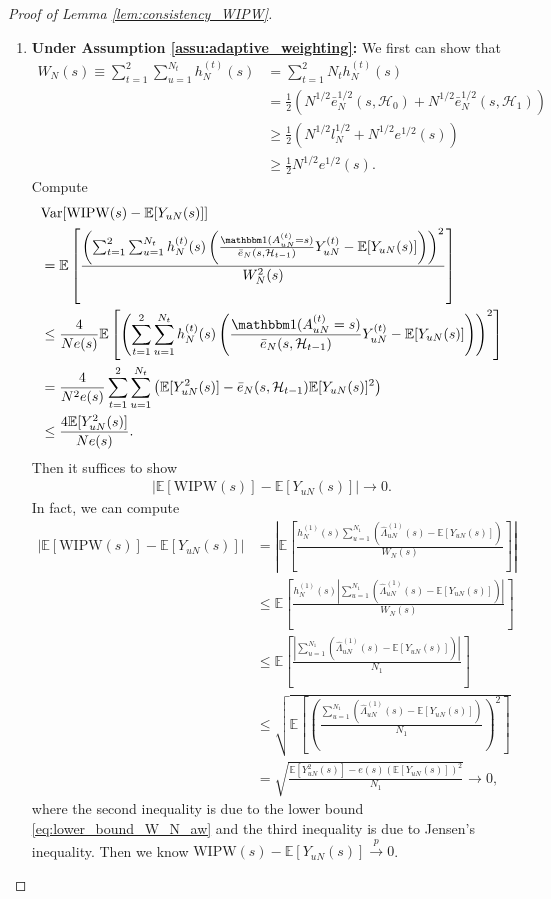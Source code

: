 \documentclass[12pt]{article}
\newcommand{\E}{\mathbb E}								%
\newcommand{\indicator}{\mathbbm 1}						%
\newcommand{\convp}{\overset p \rightarrow}             %
\newcommand{\WIPW}{\mathrm{WIPW}}
\begin{document}
\begin{proof}[Proof of Lemma \ref{lem:consistency_WIPW}]
\begin{enumerate}
		\item \textbf{Under Assumption \ref{assu:adaptive_weighting}:} We first can show that 
		\begin{align}
		W_N(s)\equiv \sum_{t=1}^2\sum_{u=1}^{N_t}h_{N}^{(t)}(s)
		&\nonumber
		= \sum_{t=1}^{2} N_t h_N^{(t)}(s)\\
		&\nonumber
		=\frac{1}{2}(N^{1/2}\bar e_N^{1/2}(s,\mathcal{H}_0)+N^{1/2}\bar e_N^{1/2}(s,\mathcal{H}_1))\\
		&\nonumber
		\geq \frac{1}{2}\left(N^{1/2}l_N^{1/2}+N^{1/2}e^{1/2}(s)\right)\\
		&\label{eq:lower_bound_W_N_aw}
		\geq \frac{1}{2}N^{1/2}e^{1/2}(s).
	\end{align}
	Compute 
	\begin{align*}
		&
		\mathrm{Var}[\WIPW(s)-\E[Y_{uN}(s)]]\\
		&
		=\E\left[\frac{\left(\sum_{t=1}^2\sum_{u=1}^{N_t}h_N^{(t)}(s)\left(\frac{\indicator(A_{uN}^{(t)}=s)}{\bar e_N(s,\mathcal{H}_{t-1})}Y_{uN}^{(t)}-\E[Y_{uN}(s)]\right)\right)^2}{W_N^2(s)}\right]\\
		&
		\leq \frac{4}{Ne(s)}\E\left[\left(\sum_{t=1}^2\sum_{u=1}^{N_t}h_N^{(t)}(s)\left(\frac{\indicator(A_{uN}^{(t)}=s)}{\bar e_N(s,\mathcal{H}_{t-1})}Y_{uN}^{(t)}-\E[Y_{uN}(s)]\right)\right)^2\right]\\
		&
		=\frac{4}{N^2e(s)}\sum_{t=1}^2\sum_{u=1}^{N_t}\left(\E[Y_{uN}^2(s)]-\bar e_N(s,\mathcal{H}_{t-1})\E[Y_{uN}(s)]^2\right)\\
		&
		\leq \frac{4\E[Y_{uN}^2(s)]}{Ne(s)}.
	\end{align*}
	Then it suffices to show 
	\begin{align*}
		|\E[\WIPW(s)]-\E[Y_{uN}(s)]|\rightarrow0.
	\end{align*}
	In fact, we can compute 
	\begin{align*}
		|\E[\WIPW(s)]-\E[Y_{uN}(s)]|
		&
		=\left|\E\left[\frac{h_N^{(1)}(s)\sum_{u=1}^{N_1}(\hat{\Lambda}_{uN}^{(1)}(s)-\E[Y_{uN}(s)])}{W_N(s)}\right]\right|\\
		&
		\leq\E\left[\frac{h_N^{(1)}(s)|\sum_{u=1}^{N_1}(\hat{\Lambda}_{uN}^{(1)}(s)-\E[Y_{uN}(s)])|}{W_N(s)}\right]\\
		&
		\leq \E\left[\frac{|\sum_{u=1}^{N_1}(\hat{\Lambda}_{uN}^{(1)}(s)-\E[Y_{uN}(s)])|}{N_1}\right]\\
		&
		\leq \sqrt{\E\left[\left(\frac{\sum_{u=1}^{N_1}(\hat{\Lambda}_{uN}^{(1)}(s)-\E[Y_{uN}(s)])}{N_1}\right)^2\right]}\\
		&
		=\sqrt{\frac{\E[Y_{uN}^2(s)]-e(s)(\E[Y_{uN}(s)])^2}{N_1}}\rightarrow0,
	\end{align*}
	where the second inequality is due to the lower bound \eqref{eq:lower_bound_W_N_aw} and the third inequality is due to Jensen's inequality. Then we know $\WIPW(s)-\E[Y_{uN}(s)]\convp 0$.
	\end{enumerate}

	

\end{proof}
\end{document}
